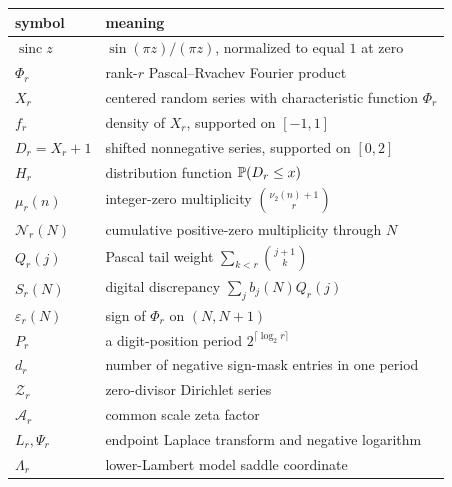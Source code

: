 \documentclass[11pt,oneside]{article}
\theoremstyle{definition}
\theoremstyle{remark}
\newcommand{\sinc}{\operatorname{sinc}}
\begin{document}
\begin{center}
\begin{tabularx}{\textwidth}{@{}lX@{}}
\toprule
symbol & meaning\\
\midrule
$\sinc z$ & $\sin(\pi z)/(\pi z)$, normalized to equal $1$ at zero\\
$\Phi_r$ & rank-$r$ Pascal--Rvachev Fourier product\\
$X_r$ & centered random series with characteristic function $\Phi_r$\\
$f_r$ & density of $X_r$, supported on $[-1,1]$\\
$D_r=X_r+1$ & shifted nonnegative series, supported on $[0,2]$\\
$H_r$ & distribution function $\mathbb P(D_r\le x)$\\
$\mu_r(n)$ & integer-zero multiplicity $\binom{\nu_2(n)+1}{r}$\\
$\mathcal N_r(N)$ & cumulative positive-zero multiplicity through $N$\\
$Q_r(j)$ & Pascal tail weight $\sum_{k<r}\binom{j+1}{k}$\\
$S_r(N)$ & digital discrepancy $\sum_jb_j(N)Q_r(j)$\\
$\varepsilon_r(N)$ & sign of $\Phi_r$ on $(N,N+1)$\\
$P_r$ & a digit-position period $2^{\lceil\log_2r\rceil}$\\
$d_r$ & number of negative sign-mask entries in one period\\
$\mathcal Z_r$ & zero-divisor Dirichlet series\\
$\mathcal A_r$ & common scale zeta factor\\
$L_r,\Psi_r$ & endpoint Laplace transform and negative logarithm\\
$\Lambda_r$ & lower-Lambert model saddle coordinate\\
\bottomrule
\end{tabularx}
\end{center}
\end{document}
